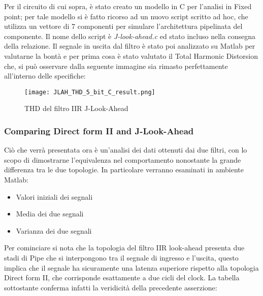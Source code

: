 Per il circuito di cui sopra, è stato creato un modello in C per l'analisi in Fixed point; per tale modello si è fatto ricorso ad un nuovo script scritto ad hoc, che utilizza un vettore di 7 componenti per simulare l'architettura pipelinata del componente. Il nome dello script è \textit{J-look-ahead.c} ed stato incluso nella consegna della relazione. Il segnale in uscita dal filtro è stato poi analizzato su Matlab per valutarne la bontà e per prima cosa è stato valutato il Total Harmonic Distorsion che, si può osservare dalla seguente immagine sia rimasto perfettamente all'interno delle specifiche:

\begin{figure}[H]
\centering
\texttt{[image: JLAH\_THD\_5\_bit\_C\_result.png]}
\caption{THD del filtro IIR J-Look-Ahead}
\label{fig:THD_5_bit_IIR_JLA}
\end{figure}

\subsubsection{Comparing Direct form II and J-Look-Ahead}
Ciò che verrà presentata ora è un'analisi dei dati ottenuti dai due filtri, con lo scopo di dimostrarne l'equivalenza nel comportamento nonostante la grande differenza tra le due topologie. In particolare verranno esaminati in ambiente Matlab:

\begin{itemize}
\item Valori iniziali dei segnali
\item Media dei due segnali
\item Varianza dei due segnali
\end{itemize}

Per cominciare si nota che la topologia del filtro IIR look-ahead presenta due stadi di Pipe che si interpongono tra il segnale di ingresso e l'uscita, questo implica che il segnale ha sicuramente una latenza superiore rispetto alla topologia Direct form II, che corrisponde esattamente a due cicli del clock. La tabella sottostante conferma infatti la veridicità della precedente asserzione:



